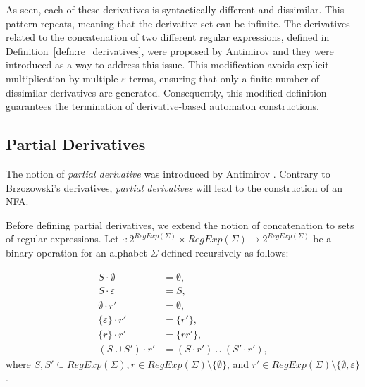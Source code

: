 As seen, each of these derivatives is syntactically different and dissimilar.
This pattern repeats, meaning that the derivative set can be infinite.
The derivatives related to the concatenation of two different regular expressions, defined in Definition~\ref{defn:re_derivatives}, were proposed by Antimirov \cite{pdregex_antimirov} and they were introduced as a way to address this issue. This modification avoids explicit multiplication by multiple $\varepsilon$ terms, ensuring that only a finite number of dissimilar derivatives are generated.
Consequently, this modified definition guarantees the termination of derivative-based automaton constructions.





\subsection{Partial Derivatives}
The notion of \textit{partial derivative} was introduced by Antimirov \cite{pdregex_antimirov}. Contrary to Brzozowski's derivatives, \textit{partial derivatives} will lead to the construction of an NFA.

Before defining partial derivatives, we extend the notion of concatenation to sets of regular expressions. Let $\cdot : 2^{RegExp(\Sigma)} \times RegExp(\Sigma) \rightarrow 2^{RegExp(\Sigma)}$ be a binary operation for an alphabet $\Sigma$ defined recursively as follows:

\begin{align*}
	S \cdot \emptyset &= \emptyset, \\
	S \cdot \varepsilon &= S, \\
	\emptyset \cdot r' &= \emptyset, \\
	\{ \varepsilon \} \cdot r' &= \{ r' \}, \\
	\{ r \} \cdot r' &= \{rr'\}, \\
	(S \cup S') \cdot r' &= (S \cdot r') \cup (S' \cdot r'),
\end{align*}
where $S, S' \subseteq RegExp(\Sigma), r \in RegExp(\Sigma) \setminus \{\emptyset\}$, and $r' \in RegExp(\Sigma) \setminus \{\emptyset, \varepsilon\}$.

